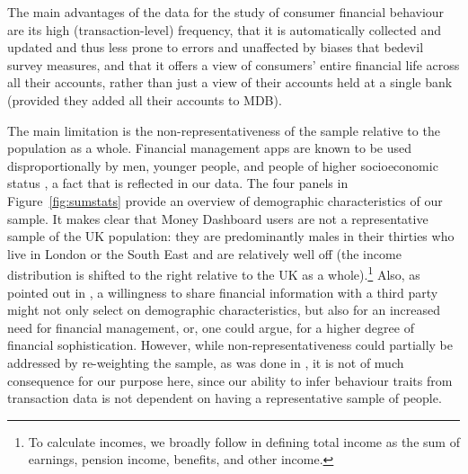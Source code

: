 The main advantages of the data for the study of consumer financial behaviour
are its high (transaction-level) frequency, that it is automatically
collected and updated and thus less prone to errors and unaffected by biases
that bedevil survey measures, and that it offers a view of consumers' entire
financial life across all their accounts, rather than just a view of their
accounts held at a single bank (provided they added all their accounts to MDB).

The main limitation is the non-representativeness of the sample relative to the
population as a whole. Financial management apps are known to be used
disproportionally by men, younger people, and people of higher socioeconomic
status \citep{carlin2019generational,mas2014money}, a fact that is reflected in
our data. The four panels in Figure~\ref{fig:sumstats} provide an overview of
demographic characteristics of our sample. It makes clear that Money Dashboard
users are not a representative sample of the UK population: they are
predominantly males in their thirties who live in London or the South East and
are relatively well off (the income distribution is shifted to the right
relative to the UK as a whole).\footnote{To calculate incomes, we broadly follow
    \citet{hacioglu2020distributional} in defining total income as the sum of
    earnings, pension income, benefits, and other income.
} Also,
as pointed out in \citet{gelman2014harnessing}, a willingness to share financial
information with a third party might not only select on demographic
characteristics, but also for an increased need for financial management, or,
one could argue, for a higher degree of financial sophistication. However, while
non-representativeness could partially be addressed by re-weighting the sample,
as was done in \citet{bhourquin2020effects}, it is not of much consequence for
our purpose here, since our ability to infer behaviour traits from transaction
data is not dependent on having a representative sample of people.



